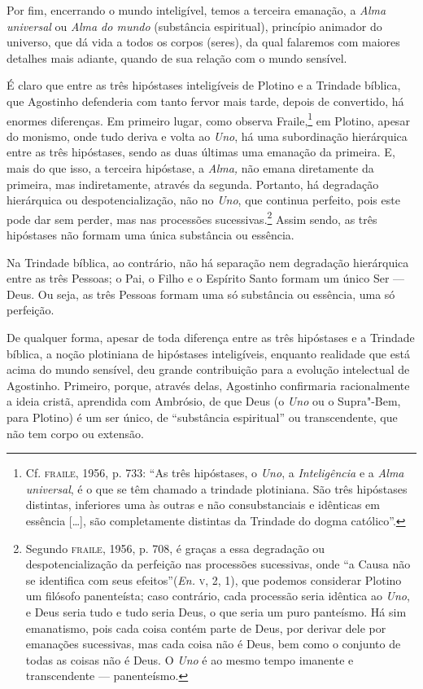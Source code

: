 Por fim, encerrando o mundo inteligível, temos a terceira
emanação,  a \emph{Alma} \emph{universal} ou \emph{Alma do
mundo} (substância espiritual), princípio animador do universo,
que dá vida a todos os corpos (seres), da qual falaremos com
maiores  detalhes  mais adiante, quando de sua relação com o
mundo sensível.

É claro que entre as três hipóstases inteligíveis de Plotino e a
Trindade bíblica, que Agostinho defenderia com tanto fervor mais
tarde, depois de convertido, há enormes diferenças. Em primeiro
lugar, como observa Fraile,\footnote{ Cf. \textsc{fraile}, 1956, p. 733:
“As três hipóstases, o \emph{Uno}, a \emph{Inteligência} e a
\emph{Alma universal}, é o que se  têm chamado a trindade
plotiniana. São três hipóstases distintas, inferiores uma às
outras e não consubstanciais e idênticas em essência [\ldots{}], são
completamente distintas da Trindade do dogma católico”.} em
Plotino, apesar do monismo, onde tudo deriva e volta ao
\emph{Uno}, há uma subordinação hierárquica entre as três
hipóstases, sendo as duas últimas uma emanação da primeira. E,
mais do que isso, a terceira hipóstase, a \emph{Alma,} não
emana diretamente da primeira, mas indiretamente, através da
segunda. Portanto, há degradação hierárquica ou
despotencialização, não no \emph{Uno}, que continua perfeito,
pois este pode dar sem perder, mas nas processões
sucessivas.\footnote{ Segundo \textsc{fraile}, 1956, p. 708,  é
graças a essa degradação ou despotencialização da perfeição nas 
processões sucessivas, onde “a Causa  não se identifica com seus
efeitos”(\emph{En.} \textsc{v}, 2, 1), que podemos considerar Plotino
um filósofo panenteísta;  caso contrário, cada processão seria
idêntica ao \emph{Uno}, e Deus seria tudo e tudo seria Deus, 
o que seria um puro panteísmo. Há sim emanatismo, pois cada
coisa  contém parte de Deus, por derivar dele por emanações
sucessivas, mas cada coisa não é Deus, bem como o conjunto de
todas as  coisas não é Deus. O \emph{Uno} é ao mesmo tempo
imanente e transcendente --- panenteísmo.} Assim sendo, as três
hipóstases não formam uma única substância ou essência. 

Na Trindade bíblica, ao contrário, não há separação nem
degradação hierárquica entre as três Pessoas; o Pai, o Filho e o
Espírito Santo formam um único Ser --- Deus. Ou seja, as três
Pessoas formam uma só substância ou essência, uma só perfeição. 

De qualquer forma, apesar de toda diferença entre as três
hipóstases e a Trindade bíblica, a noção plotiniana de
hipóstases inteligíveis, enquanto realidade que está acima do
mundo sensível, deu grande contribuição para a evolução
intelectual de Agostinho. Primeiro, porque, através delas,
Agostinho confirmaria racionalmente  a ideia cristã, aprendida
com Ambrósio, de que Deus (o \emph{Uno} ou o Supra"-Bem, para
Plotino) é um ser único, de “substância espiritual” ou
transcendente, que não tem corpo ou extensão. 

